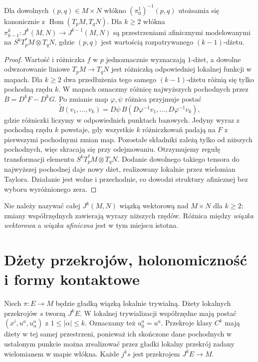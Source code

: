 \begin{twierdzenie}
\label{thm:dzety-affine}
Dla dowolnych $(p,q)\in M\times N$ włókno
$(\pi_0^1)^{-1}(p,q)$ utożsamia się kanonicznie z
$\operatorname{Hom}(T_pM,T_qN)$. Dla $k\ge2$ włókna
$\pi_{k-1}^k:J^k(M,N)\to J^{k-1}(M,N)$ są przestrzeniami
afinicznymi modelowanymi na
$S^kT_p^*M\otimes T_qN$, gdzie $(p,q)$ jest
wartością rozpatrywanego $(k-1)$-dżetu.
\end{twierdzenie}
\begin{proof}
Wartość i różniczka $f$ w $p$ jednoznacznie wyznaczają
$1$-dżet, a dowolne odwzorowanie liniowe
$T_pM\to T_qN$ jest różniczką odpowiedniej lokalnej funkcji
w mapach. Dla $k\ge2$ dwa przedłużenia tego samego
$(k-1)$-dżetu różnią się tylko pochodną rzędu $k$.
W mapach oznaczmy różnicę najwyższych pochodnych
przez $B=D^kF-D^kG$. Po zmianie map $\varphi,\psi$
różnica przyjmuje postać
\[
 \widetilde B(v_1,\ldots,v_k)
 =D\psi\,B(D\varphi^{-1}v_1,\ldots,D\varphi^{-1}v_k),
\]
gdzie różniczki liczymy w odpowiednich punktach
bazowych. Jedyny wyraz z pochodną rzędu $k$
powstaje, gdy wszystkie $k$ różniczkowań padają
na $F$ z pierwszymi pochodnymi zmian map.
Pozostałe składniki zależą tylko od niższych
pochodnych, więc skracają się przy odejmowaniu.
Otrzymujemy regułę transformacji elementu
$S^kT_p^*M\otimes T_qN$. Dodanie dowolnego takiego
tensora do najwyższej pochodnej daje nowy dżet,
realizowany lokalnie przez wielomian Taylora.
Działanie jest wolne i przechodnie, co dowodzi
struktury afinicznej bez wyboru wyróżnionego zera.
\end{proof}

\begin{uwaga}
Nie należy nazywać całej $J^k(M,N)$ wiązką wektorową
nad $M\times N$ dla $k\ge2$: zmiany współrzędnych
zawierają wyrazy niższych rzędów. Różnica między
\emph{wiązka wektorowa} a \emph{wiązka afiniczna}
jest w tym miejscu istotna.
\end{uwaga}

\section{Dżety przekrojów, holonomiczność i formy kontaktowe}
Niech $\pi:E\to M$ będzie gładką wiązką lokalnie trywialną.
Dżety lokalnych przekrojów $s$ tworzą $J^kE$.
W lokalnej trywializacji współrzędne mają postać
$(x^i,u^a,u^a_\alpha)$ z $1\le|\alpha|\le k$.
Oznaczamy też $u^a_0=u^a$. Przekroje klasy $C^k$
mają dżety w tej samej przestrzeni, ponieważ ich
skończone dane pochodnych w ustalonym punkcie
można zrealizować przez gładki lokalny przekrój
zadany wielomianem w mapie włókna.
Każde $j^ks$ jest przekrojem $J^kE\to M$.

